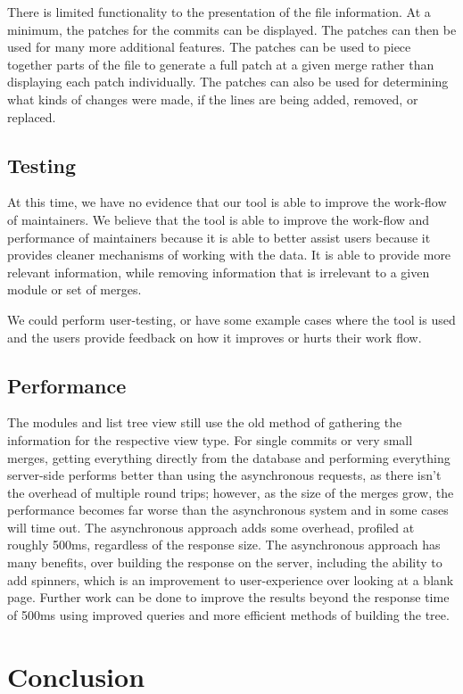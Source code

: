 \documentclass[conference, draftclsnofoot]{IEEEtran}
\begin{document}
There is limited functionality to the presentation of the file information. At
a minimum, the patches for the commits can be displayed. The patches can then
be used for many more additional features. The patches can be used to piece
together parts of the file to generate a full patch at a given merge rather
than displaying each patch individually. The patches can also be used for
determining what kinds of changes were made, if the lines are being added,
removed, or replaced.

\subsection{Testing}
At this time, we have no evidence that our tool is able to improve the
work-flow of maintainers. We believe that the tool is able to improve the
work-flow and performance of maintainers because it is able to better assist
users because it provides cleaner mechanisms of working with the data. It is
able to provide more relevant information, while removing information that is
irrelevant to a given module or set of merges.

We could perform user-testing, or have some example cases where the tool is
used and the users provide feedback on how it improves or hurts their work
flow.

\subsection{Performance}
The modules and list tree view still use the old method of gathering the
information for the respective view type. For single commits or very small
merges, getting everything directly from the database and performing everything
server-side performs better than using the asynchronous requests, as there
isn't the overhead of multiple round trips; however, as the size of the merges
grow, the performance becomes far worse than the asynchronous system and in
some cases will time out. The asynchronous approach adds some overhead,
profiled at roughly 500ms, regardless of the response size. The asynchronous
approach has many benefits, over building the response on the server, including
the ability to add spinners, which is an improvement to user-experience over
looking at a blank page. Further work can be done to improve the results beyond
the response time of 500ms using improved queries and more efficient methods of
building the tree.

\section{Conclusion}





\end{document}
